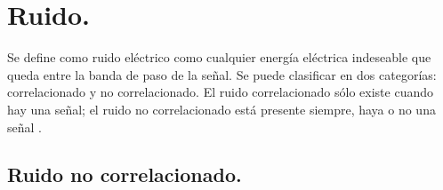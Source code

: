 \section*{\fontsize{12}{18}\selectfont Ruido.}

\begin{justify}
    Se define como ruido eléctrico como cualquier energía eléctrica indeseable que queda entre la banda
    de paso de la señal. Se puede clasificar en dos categorías: correlacionado y no correlacionado. El
    ruido correlacionado sólo existe cuando hay una señal; el ruido no correlacionado está presente siempre,
    haya o no una señal \parencite{tomasi2003sistemas}.
\end{justify}

\subsection*{\fontsize{12}{18}\selectfont Ruido no correlacionado.}


